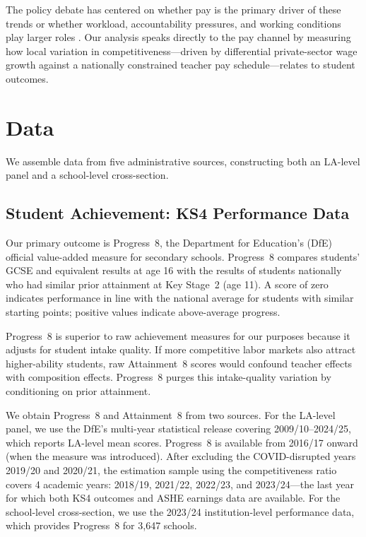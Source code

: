 \documentclass[12pt]{article}
\begin{document}
The policy debate has centered on whether pay is the primary driver of these trends or whether workload, accountability pressures, and working conditions play larger roles \citep{loeb2004qualifications}. Our analysis speaks directly to the pay channel by measuring how local variation in competitiveness---driven by differential private-sector wage growth against a nationally constrained teacher pay schedule---relates to student outcomes.


\section{Data}

We assemble data from five administrative sources, constructing both an LA-level panel and a school-level cross-section.

\subsection{Student Achievement: KS4 Performance Data}

Our primary outcome is Progress~8, the Department for Education's (DfE) official value-added measure for secondary schools. Progress~8 compares students' GCSE and equivalent results at age 16 with the results of students nationally who had similar prior attainment at Key Stage~2 (age 11). A score of zero indicates performance in line with the national average for students with similar starting points; positive values indicate above-average progress.

Progress~8 is superior to raw achievement measures for our purposes because it adjusts for student intake quality. If more competitive labor markets also attract higher-ability students, raw Attainment~8 scores would confound teacher effects with composition effects. Progress~8 purges this intake-quality variation by conditioning on prior attainment.

We obtain Progress~8 and Attainment~8 from two sources. For the LA-level panel, we use the DfE's multi-year statistical release covering 2009/10--2024/25, which reports LA-level mean scores. Progress~8 is available from 2016/17 onward (when the measure was introduced). After excluding the COVID-disrupted years 2019/20 and 2020/21, the estimation sample using the competitiveness ratio covers 4 academic years: 2018/19, 2021/22, 2022/23, and 2023/24---the last year for which both KS4 outcomes and ASHE earnings data are available. For the school-level cross-section, we use the 2023/24 institution-level performance data, which provides Progress~8 for 3,647 schools.
\end{document}
